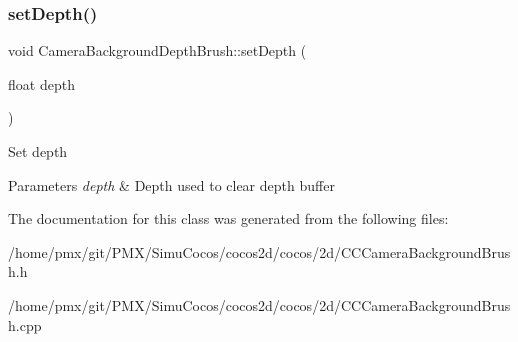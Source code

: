 \subsubsection{\texorpdfstring{set\+Depth()}{setDepth()}\hspace{0.1cm}{\footnotesize\ttfamily [2/2]}}
{\footnotesize\ttfamily void Camera\+Background\+Depth\+Brush\+::set\+Depth (\begin{DoxyParamCaption}\item[{float}]{depth }\end{DoxyParamCaption})\hspace{0.3cm}{\ttfamily [inline]}}

Set depth 
\begin{DoxyParams}{Parameters}
{\em depth} & Depth used to clear depth buffer \\
\hline
\end{DoxyParams}


The documentation for this class was generated from the following files\+:\begin{DoxyCompactItemize}
\item 
/home/pmx/git/\+P\+M\+X/\+Simu\+Cocos/cocos2d/cocos/2d/C\+C\+Camera\+Background\+Brush.\+h\item 
/home/pmx/git/\+P\+M\+X/\+Simu\+Cocos/cocos2d/cocos/2d/C\+C\+Camera\+Background\+Brush.\+cpp\end{DoxyCompactItemize}
